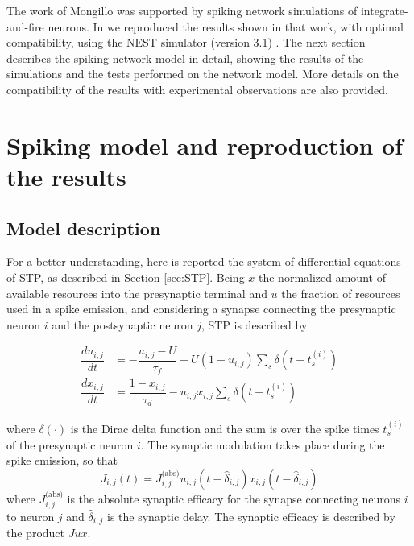 \documentclass[a4paper, 12pt, twoside, openright]{book}
\begin{document}
The work of Mongillo was supported by spiking network simulations of integrate-and-fire neurons. In \cite{Tiddia2022_WM} we reproduced the results shown in that work, with optimal compatibility, using the NEST simulator (version 3.1) \cite{nest3.1}. The next section describes the spiking network model in detail, showing the results of the simulations and the tests performed on the network model. More details on the compatibility of the results with experimental observations are also provided.

\section{Spiking model and reproduction of the results}

\subsection{Model description}
\label{sec:wm_model_description}
For a better understanding, here is reported the system of differential equations of STP, as described in Section \ref{sec:STP}. Being $x$ the normalized amount of available resources into the presynaptic terminal and $u$ the fraction of resources used in a spike emission, and considering a synapse connecting the presynaptic neuron $i$ and the postsynaptic neuron $j$, STP is described by 

\begin{equation}
    \begin{split}
    \dfrac{du_{i,j}}{dt} &= -\dfrac{u_{i,j} - U}{\tau_f} + U(1-u_{i,j})\sum_s\delta (t-t_s^{(i)}) \\
    \dfrac{dx_{i,j}}{dt} &= \dfrac{1-x_{i,j}}{\tau_d} - u_{i,j}x_{i,j} \sum_s\delta (t-t_s^{(i)})
    \end{split}
\end{equation}

where $\delta (\cdot)$ is the Dirac delta function and the sum is over the spike times $t_s^{(i)}$ of the presynaptic neuron $i$. The synaptic modulation takes place during the spike emission, so that
\begin{equation}
    J_{i,j}(t) = J^{\text{(abs)}}_{i,j}u_{i,j}(t-\hat{\delta}_{i,j})x_{i,j}(t-\hat{\delta}_{i,j})
\end{equation}
where $J^{\text{(abs)}}_{i,j}$ is the absolute synaptic efficacy for the synapse connecting neurons $i$ to neuron $j$ and $\hat{\delta}_{i,j}$ is the synaptic delay. The synaptic efficacy is described by the product $Jux$.
\end{document}
